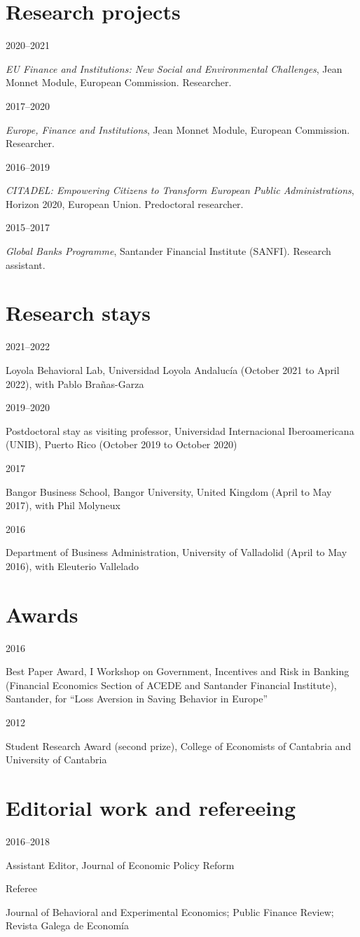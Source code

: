 \documentclass[11pt,a4paper]{article}
\newcommand{\entry}[2]{\begin{minipage}[t]{2.6cm}\sffamily\small\textcolor{muted}{#1}\end{minipage}%
  \begin{minipage}[t]{\linewidth-2.6cm}\raggedright #2\end{minipage}\par\vspace{4pt}}
\begin{document}
\section{Research projects}
\entry{2020–2021}{\emph{EU Finance and Institutions: New Social and Environmental Challenges}, Jean Monnet Module, European Commission. Researcher.}
\entry{2017–2020}{\emph{Europe, Finance and Institutions}, Jean Monnet Module, European Commission. Researcher.}
\entry{2016–2019}{\emph{CITADEL: Empowering Citizens to Transform European Public Administrations}, Horizon 2020, European Union. Predoctoral researcher.}
\entry{2015–2017}{\emph{Global Banks Programme}, Santander Financial Institute (SANFI). Research assistant.}

\section{Research stays}
\entry{2021–2022}{Loyola Behavioral Lab, Universidad Loyola Andalucía (October 2021 to April 2022), with Pablo Brañas-Garza}
\entry{2019–2020}{Postdoctoral stay as visiting professor, Universidad Internacional Iberoamericana (UNIB), Puerto Rico (October 2019 to October 2020)}
\entry{2017}{Bangor Business School, Bangor University, United Kingdom (April to May 2017), with Phil Molyneux}
\entry{2016}{Department of Business Administration, University of Valladolid (April to May 2016), with Eleuterio Vallelado}

\section{Awards}
\entry{2016}{Best Paper Award, I Workshop on Government, Incentives and Risk in Banking (Financial Economics Section of ACEDE and Santander Financial Institute), Santander, for “Loss Aversion in Saving Behavior in Europe”}
\entry{2012}{Student Research Award (second prize), College of Economists of Cantabria and University of Cantabria}

\section{Editorial work and refereeing}
\entry{2016–2018}{Assistant Editor, Journal of Economic Policy Reform}
\entry{Referee}{Journal of Behavioral and Experimental Economics; Public Finance Review; Revista Galega de Economía}
\end{document}
